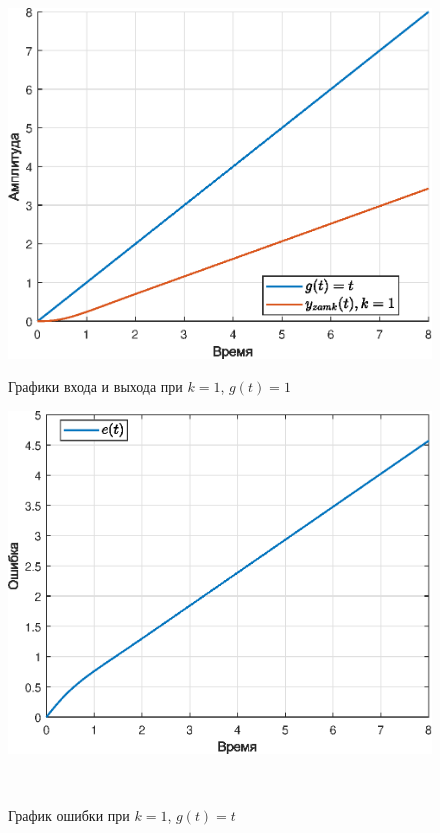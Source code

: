 \documentclass[a4paper]{article}
\begin{document}
\begin{figure}[H]
    \begin{minipage}{0.5\textwidth}
        \centering \includegraphics[width=\textwidth]{ex3/k1_g_vt.eps}
        \caption{Графики входа и выхода при $k=1$, $g(t)=1$}
    \end{minipage}\hfill
    \begin{minipage}{0.5\textwidth}
        \centering \includegraphics[width=\textwidth]{ex3/k1_g_vt_error.eps}
        \caption{График ошибки при $k=1$, $g(t)=t$}
    \end{minipage}\\[1em]
\end{figure}\noindent\
\end{document}
